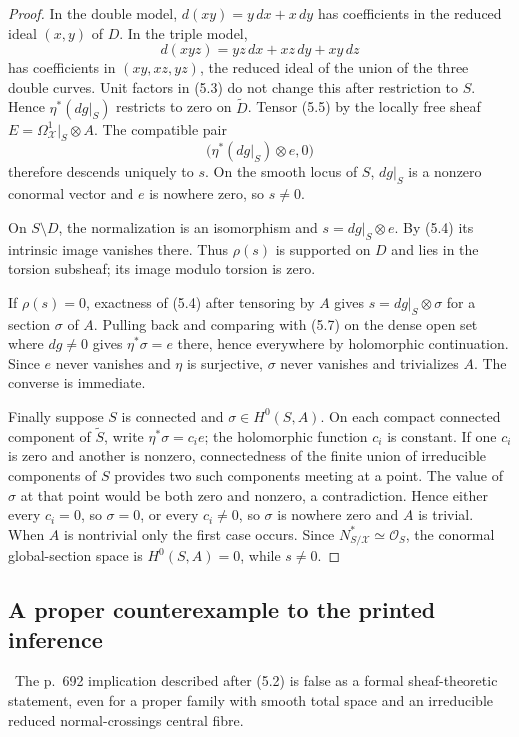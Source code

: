 \begin{proof}
In the double model, $d(xy)=y\,dx+x\,dy$ has coefficients in the reduced
ideal $(x,y)$ of $D$.  In the triple model,
\[
d(xyz)=yz\,dx+xz\,dy+xy\,dz
\]
has coefficients in $(xy,xz,yz)$, the reduced ideal of the union of the
three double curves.  Unit factors in (5.3) do not change this after
restriction to $S$.  Hence $\eta^*(dg|_S)$ restricts to zero on
$\widetilde D$.  Tensor (5.5) by the locally free sheaf
$E=\Omega^1_{\mathcal X}|_S\otimes A$.  The compatible pair
\[
\bigl(\eta^*(dg|_S)\otimes e,0\bigr)
\]
therefore descends uniquely to $s$.  On the smooth locus of $S$, $dg|_S$
is a nonzero conormal vector and $e$ is nowhere zero, so $s\ne0$.

On $S\setminus D$, the normalization is an isomorphism and
$s=dg|_S\otimes e$.  By (5.4) its intrinsic image vanishes there.  Thus
$\rho(s)$ is supported on $D$ and lies in the torsion subsheaf; its image
modulo torsion is zero.

If $\rho(s)=0$, exactness of (5.4) after tensoring by $A$ gives
$s=dg|_S\otimes\sigma$ for a section $\sigma$ of $A$.  Pulling back and
comparing with (5.7) on the dense open set where $dg\ne0$ gives
$\eta^*\sigma=e$ there, hence everywhere by holomorphic continuation.
Since $e$ never vanishes and $\eta$ is surjective, $\sigma$ never vanishes
and trivializes $A$.  The converse is immediate.

Finally suppose $S$ is connected and $\sigma\in H^0(S,A)$.  On each compact
connected component of $\widetilde S$, write
$\eta^*\sigma=c_i e$; the holomorphic function $c_i$ is constant.  If one
$c_i$ is zero and another is nonzero, connectedness of the finite union of
irreducible components of $S$ provides two such components meeting at a
point.  The value of $\sigma$ at that point would be both zero and nonzero,
a contradiction.  Hence either every $c_i=0$, so $\sigma=0$, or every
$c_i\ne0$, so $\sigma$ is nowhere zero and $A$ is trivial.  When $A$ is
nontrivial only the first case occurs.  Since
$N^*_{S/\mathcal X}\simeq\mathcal O_S$, the conormal global-section space is
$H^0(S,A)=0$, while $s\ne0$.
\end{proof}

\subsection{A proper counterexample to the printed inference}

\begin{theorem}\label{prop:nodal-counterexample}
\Refuted\ The p.~692 implication described after (5.2) is false as a formal
sheaf-theoretic statement, even for a proper family with smooth total space
and an irreducible reduced normal-crossings central fibre.
\end{theorem}

